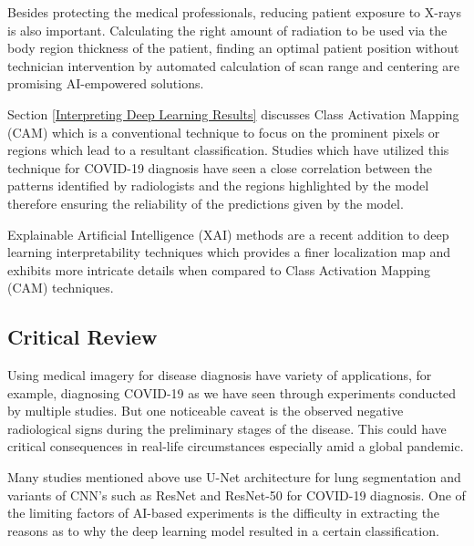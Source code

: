 Besides protecting the medical professionals, reducing patient 
exposure to X-rays is also important. Calculating the right amount of radiation 
to be used via the body region thickness of the patient, finding an optimal patient position without technician intervention by automated calculation of 
scan range and centering are promising AI-empowered solutions.

Section \ref{Interpreting Deep Learning Results} discusses Class Activation Mapping (CAM) which is a conventional 
technique to focus on the prominent pixels or regions which lead to a 
resultant classification. Studies which have utilized this technique 
for COVID-19 diagnosis have seen a close correlation between the patterns 
identified by radiologists and the regions highlighted by the model therefore 
ensuring the reliability of the predictions given by the model.

Explainable Artificial Intelligence (XAI) methods \cite{ADD+2020, FSA+2020} are a recent addition 
to deep learning interpretability techniques which provides a finer localization 
map and exhibits more intricate details when compared to 
Class Activation Mapping (CAM) techniques.

\subsection{Critical Review}

Using medical imagery for disease diagnosis have variety of applications, for example, 
diagnosing COVID-19 as we have seen through experiments conducted by multiple studies. But one noticeable caveat is the observed negative radiological signs during the preliminary stages of the disease. This could have critical consequences in real-life circumstances especially amid a global pandemic.


Many studies mentioned above use U-Net architecture for lung segmentation and variants of CNN's such as ResNet and ResNet-50 for COVID-19 diagnosis. One of the limiting factors of AI-based experiments is the difficulty in extracting the reasons as to why the deep learning model resulted in a certain classification. 

